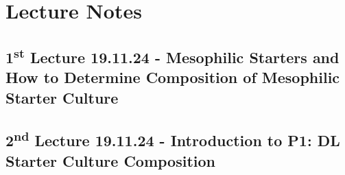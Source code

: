 \chapter{Lecture Notes}
\setlength{\headheight}{12.71342pt}
\addtolength{\topmargin}{-0.71342pt}

\section{1\texorpdfstring{\textsuperscript{st}}{st} Lecture 19.11.24 - Mesophilic Starters and How to Determine Composition of Mesophilic Starter Culture}

\section{2\texorpdfstring{\textsuperscript{nd}}{nd} Lecture 19.11.24 - Introduction to P1: DL Starter Culture Composition}



